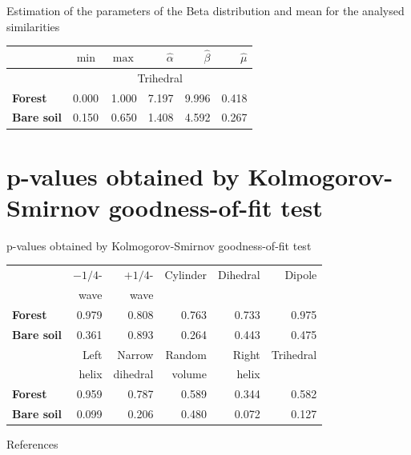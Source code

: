 \documentclass[10pt]{beamer}
\begin{document}
\begin{frame}[fragile]{Estimation of the parameters of the Beta distribution and mean for the analysed similarities}
    \begin{table}[hbt]
    \centering
    \begin{tabular}{lrrrrr}
    \toprule
    & $\min$ & $\max$ & $\widehat\alpha$ & $\widehat\beta$ & $\widehat\mu$\\ \midrule
    & \multicolumn{5}{c}{Trihedral}\\
    \cmidrule(lr){2-6}
    \textbf{Forest} & 0.000 & 1.000 & 7.197 & 9.996 & 0.418\\
    \textbf{Bare soil} & 0.150 & 0.650 & 1.408 & 4.592 & 0.267\\
    \bottomrule
    \end{tabular}
    \end{table}
\end{frame}

\section[Goodness-of-fit test]{p-values obtained by Kolmogorov-Smirnov goodness-of-fit test}

\begin{frame}{p-values obtained by Kolmogorov-Smirnov goodness-of-fit test}
    \begin{table}[hbt]
    \centering
    \begin{tabular}{lrrrrr}
    \toprule
    & $-1/4$- & $+1/4$- & Cylinder & Dihedral & Dipole\\
    & wave & wave & & &\\
    \cmidrule(lr){2-6}
    \textbf{Forest} & 0.979 & 0.808 & 0.763 & 0.733 & 0.975\\
    \textbf{Bare soil} & 0.361 & 0.893 & 0.264 & 0.443 & 0.475\\
    \midrule
    & Left & Narrow & Random & Right & Trihedral\\
    & helix & dihedral & volume & helix & \\
    \cmidrule(lr){2-6}
    \textbf{Forest} & 0.959 & 0.787 & 0.589 & 0.344 & 0.582\\
    \textbf{Bare soil} & 0.099 & 0.206 & 0.480 & 0.072 & 0.127\\
    \bottomrule
    \end{tabular} 
    \end{table}
\end{frame}

\begin{frame}[allowframebreaks]{References}

  
  

\end{frame}
\end{document}
